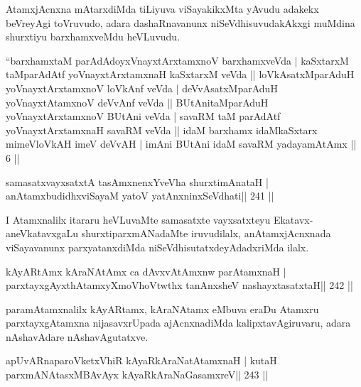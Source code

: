 \begin{artha}
AtamxjAcnxna mAtarxdiMda tiLiyuva viSayakikxMta yAvudu adakekx beVreyAgi toVruvudo, adara dashaRnavanunx niSeVdhisuvudakAkxgi muMdina shurxtiyu barxhamxveMdu heVLuvudu.
\end{artha}


\begin{kandikeshl}
``barxhamxtaM parAdAdoyxVnayxtArxtamxnoV barxhamxveVda |
kaSxtarxM taMparAdAtf yoV\s nayxtArxtamxnaH kaSxtarxM veVda ||
loVkAsatxMparAduH yoV\s nayxtArxtamxnoV loVkAnf veVda |
deVvAsatxMparAduH yoV\s nayxtAtamxnoV deVvAnf veVda ||
BUtAnitaMparAduH yoV\s nayxtArxtamxnoV BUtAni veVda |
savaRM taM parAdAtf yoV\s nayxtArxtamxnaH savaRM veVda ||
idaM barxhamx idaMkaSxtarx mimeVloVkAH imeV deVvAH |
imAni BUtAni idaM savaRM yadayamAtAmx || 6 ||
\end{kandikeshl}


\begin{shl}
samasatxvayxsatxtA tasAmxnenxYveVha shurxtimAnataH |
anAtamxbudidhxviSayaM yatoV yatAnxninxSeVdhati\hfill || 241 ||
\end{shl}

\begin{artha}
I Atamxnalilx itararu heVLuvaMte samasatxte vayxsatxteyu Ekatavx-aneVkatavxgaLu shurxtiparxmANadaMte iruvudilalx, anAtamxjAcnxnada viSayavanunx parxyatanxdiMda niSeVdhisutatxdeyAdadxriMda ilalx.
\end{artha}

\begin{shl}
kAyARtAmx kAraNAtAmx ca dAvxvAtAmxnw parAtamxnaH |
parxtayxgAyxthAtamxyXmoVhoVtwthx tanAnxsheV nashayxtasatxtaH\hfill || 242 ||
\end{shl}

\begin{artha}
paramAtamxnalilx kAyARtamx, kAraNAtamx eMbuva eraDu Atamxru parxtayxgAtamxna nijasavxrUpada ajAcnxnadiMda kalipxtavAgiruvaru, adara nAshavAdare nAshavAgutatxve.
\end{artha}

\begin{shl}
apUvARnaparoVketxVhiR kAyaRkAraNatA\s\s tamxnaH |
kutaH parxmANAtasxMBAvAyx kAyaRkAraNaGasamxreV\hfill || 243 ||
\end{shl}

